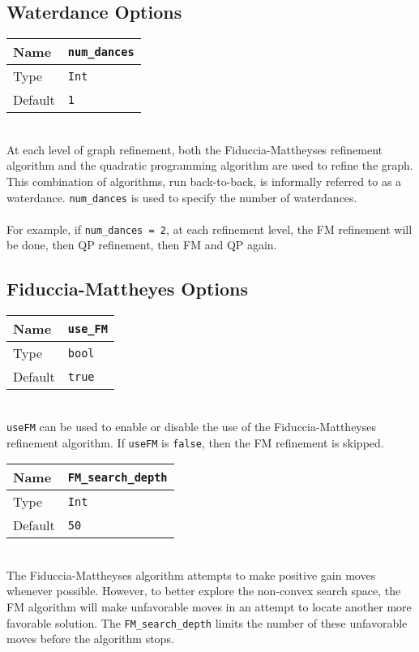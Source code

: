 \documentclass[letter]{article}
\begin{document}
\subsection{Waterdance Options}
\begin{tabular}{|l|l|} \hline
Name & \texttt{num\_dances} \\ \hline
Type & \texttt{Int} \\ \hline
Default & \texttt{1} \\ \hline
\end{tabular}\\
                      
At each level of graph refinement, both the Fiduccia-Mattheyses refinement algorithm and the quadratic programming algorithm are used to refine the graph. This combination of algorithms, run back-to-back, is informally referred to as a waterdance. \texttt{num\_dances} is used to specify the number of waterdances.\\
\\
For example, if \texttt{num\_dances = 2}, at each refinement level, the FM refinement will be done, then QP refinement, then FM and QP again.

\subsection{Fiduccia-Mattheyes Options}

\begin{tabular}{|l|l|} \hline
Name & \texttt{use\_FM} \\ \hline
Type & \texttt{bool} \\ \hline
Default & \texttt{true} \\ \hline
\end{tabular}\\

\texttt{useFM} can be used to enable or disable the use of the Fiduccia-Mattheyses refinement algorithm. If \texttt{useFM} is \texttt{false}, then the FM refinement is skipped.\\

\begin{tabular}{|l|l|} \hline
Name & \texttt{FM\_search\_depth} \\ \hline
Type & \texttt{Int} \\ \hline
Default & \texttt{50} \\ \hline
\end{tabular}\\

The Fiduccia-Mattheyses algorithm attempts to make positive gain moves whenever possible. However, to better explore the non-convex search space, the FM algorithm will make unfavorable moves in an attempt to locate another more favorable solution. The \texttt{FM\_search\_depth} limits the number of these unfavorable moves before the algorithm stops.
\end{document}
